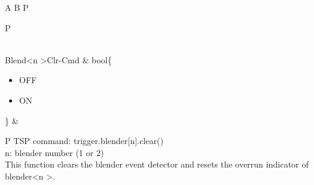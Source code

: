 \documentclass[openany]{article}
\begin{document}
\begin{longtable}{A B P}
\begin{tabular}{P}
				\end{tabular} \\ \hline
		Blend{\textless n \textgreater}Clr-Cmd & bool\{\begin{itemize}[noitemsep]
					\small
					\item[] OFF
					\item[] ON
				\end{itemize}\} & 
				\begin{tabular}{P}
					TSP command: trigger.blender[n].clear() \\
					n: blender number (1 or 2) \\
					This function clears the blender event detector and resets the overrun indicator of blender\textless n \textgreater.
				\end{tabular} \\ \hline
	\end{longtable}
\end{document}
